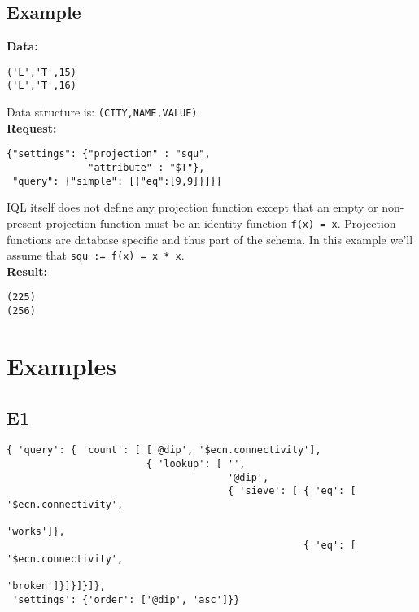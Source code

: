 \documentclass[a4paper]{article}
\begin{document}
\subsection{Example}

\textbf{Data:}

\begin{verbatim}
('L','T',15)
('L','T',16)
\end{verbatim}

Data structure is: \verb|(CITY,NAME,VALUE)|. \\

\textbf{Request:}

\begin{verbatim}
{"settings": {"projection" : "squ",
              "attribute" : "$T"},
 "query": {"simple": [{"eq":[9,9]}]}}
\end{verbatim}

IQL itself does not define any projection function except that an
empty or non-present projection function must be an identity function
\verb|f(x) = x|.
Projection functions are database specific and thus part of the schema. In this example we'll assume that \verb|squ := f(x) = x * x|. \\

\textbf{Result:}

\begin{verbatim}
(225)
(256)
\end{verbatim}

\section{Examples}

\subsection{E1}

\tiny
\begin{verbatim}
{ 'query': { 'count': [ ['@dip', '$ecn.connectivity'],
                        { 'lookup': [ '',
                                      '@dip',
                                      { 'sieve': [ { 'eq': [ '$ecn.connectivity',
                                                             'works']},
                                                   { 'eq': [ '$ecn.connectivity',
                                                             'broken']}]}]}]},
 'settings': {'order': ['@dip', 'asc']}}
\end{verbatim}
\normalsize
\end{document}
